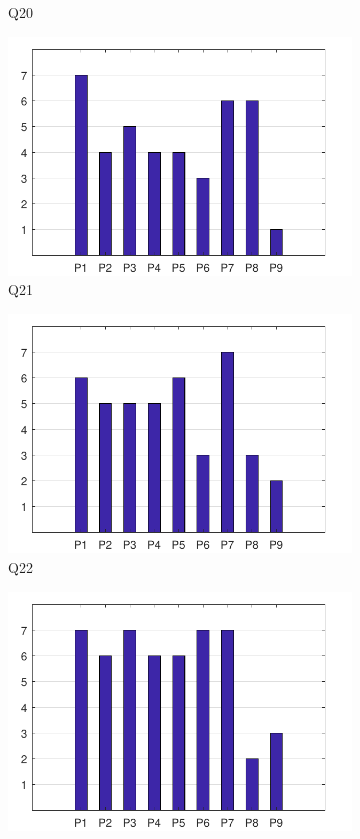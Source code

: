 \documentclass[english, 12pt, a4paper, pdftex, elec, utf8]{aaltothesis}
\begin{document}
\begin{figure}[h!]
\begin{subfigure}[b]{0.49\textwidth}
        \caption*{Q20}
    \end{subfigure}
    \begin{subfigure}[b]{0.49\textwidth}
        \includegraphics[width=\textwidth]{T2_12.pdf}
        \caption*{Q21}
    \end{subfigure}
    \begin{subfigure}[b]{0.49\textwidth}
        \includegraphics[width=\textwidth]{T2_13.pdf}
        \caption*{Q22}
    \end{subfigure}
    \begin{subfigure}[b]{0.49\textwidth}
        \includegraphics[width=\textwidth]{T2_14.pdf}

\end{subfigure}
\end{figure}
\end{document}
